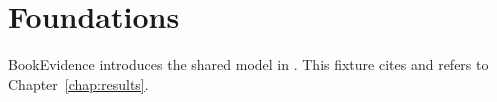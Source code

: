 \chapter{Foundations}\label{chap:foundations}
BookEvidence introduces the shared model in \corpusname.
This fixture cites \cite{book2026} and refers to Chapter~\ref{chap:results}.
